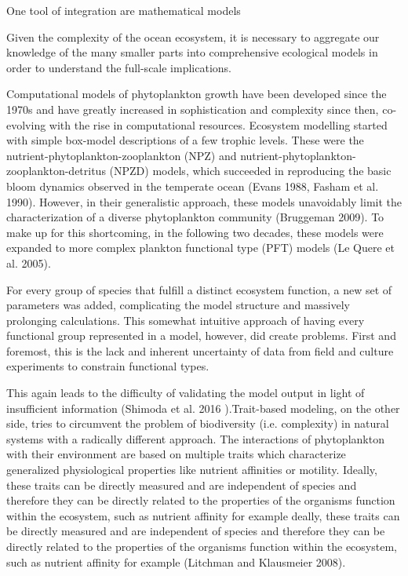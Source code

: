 One tool of integration are mathematical models

Given the complexity of the ocean ecosystem, it is necessary to aggregate our knowledge of the many smaller parts into comprehensive ecological models in order to understand the full-scale implications. 

Computational models of phytoplankton growth have been developed since the 1970s and have greatly increased in sophistication and complexity since then, co-evolving with the rise in computational resources. Ecosystem modelling started with simple box-model descriptions of a few trophic levels. These were the nutrient-phytoplankton-zooplankton (NPZ) and nutrient-phytoplankton-zooplankton-detritus (NPZD) models, which succeeded in reproducing the basic bloom dynamics observed in the temperate ocean (Evans 1988, Fasham et al. 1990). However, in their generalistic approach, these models unavoidably limit the characterization of a diverse phytoplankton community (Bruggeman 2009). To make up for this shortcoming, in the following two decades, these models were expanded to more complex plankton functional type (PFT) models (Le Quere et al. 2005). 

For every group of species that fulfill a distinct ecosystem function, a new set of parameters was added, complicating the model structure and massively prolonging calculations. This somewhat intuitive approach of having every functional group represented in a model, however, did create problems. First and foremost, this is the lack and inherent uncertainty of data from field and culture experiments to constrain functional types. 

This again leads to the difficulty of validating the model output in light of insufficient information (Shimoda et al. 2016 ).Trait-based modeling, on the other side, tries to circumvent the problem of biodiversity (i.e. complexity) in natural systems with a radically different approach. The interactions of phytoplankton with their environment are based on multiple traits which characterize generalized physiological properties like nutrient affinities or motility. Ideally, these traits can be directly measured and are independent of species and therefore they can be directly related to the properties of the organisms function within the ecosystem, such as nutrient affinity for example deally, these traits can be directly measured and are independent of species and therefore they can be directly related to the properties of the organisms function within the ecosystem, such as nutrient affinity for example (Litchman and Klausmeier 2008).  


